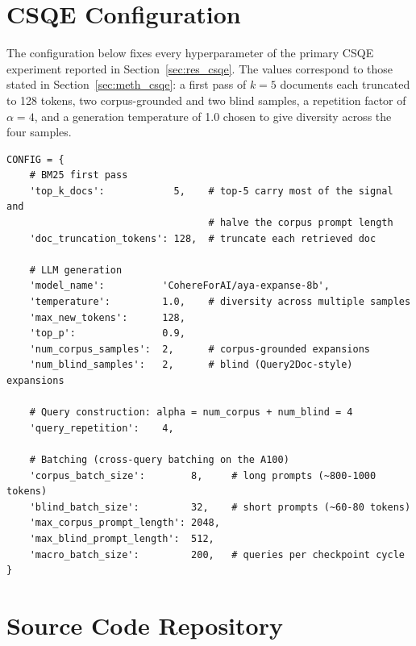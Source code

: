 \section{CSQE Configuration}
\label{app:code_config}

The configuration below fixes every hyperparameter of the primary CSQE experiment
reported in Section~\ref{sec:res_csqe}. The values correspond to those stated in
Section~\ref{sec:meth_csqe}: a first pass of $k=5$ documents each truncated to 128
tokens, two corpus-grounded and two blind samples, a repetition factor of
$\alpha = 4$, and a generation temperature of 1.0 chosen to give diversity across
the four samples.

\begin{codeblock}
\begin{lstlisting}[caption={Configuration for the primary CSQE experiment.},label={lst:config}]
CONFIG = {
    # BM25 first pass
    'top_k_docs':            5,    # top-5 carry most of the signal and
                                   # halve the corpus prompt length
    'doc_truncation_tokens': 128,  # truncate each retrieved doc

    # LLM generation
    'model_name':          'CohereForAI/aya-expanse-8b',
    'temperature':         1.0,    # diversity across multiple samples
    'max_new_tokens':      128,
    'top_p':               0.9,
    'num_corpus_samples':  2,      # corpus-grounded expansions
    'num_blind_samples':   2,      # blind (Query2Doc-style) expansions

    # Query construction: alpha = num_corpus + num_blind = 4
    'query_repetition':    4,

    # Batching (cross-query batching on the A100)
    'corpus_batch_size':        8,     # long prompts (~800-1000 tokens)
    'blind_batch_size':         32,    # short prompts (~60-80 tokens)
    'max_corpus_prompt_length': 2048,
    'max_blind_prompt_length':  512,
    'macro_batch_size':         200,   # queries per checkpoint cycle
}
\end{lstlisting}
\end{codeblock}

\section{Source Code Repository}
\label{app:repo}

